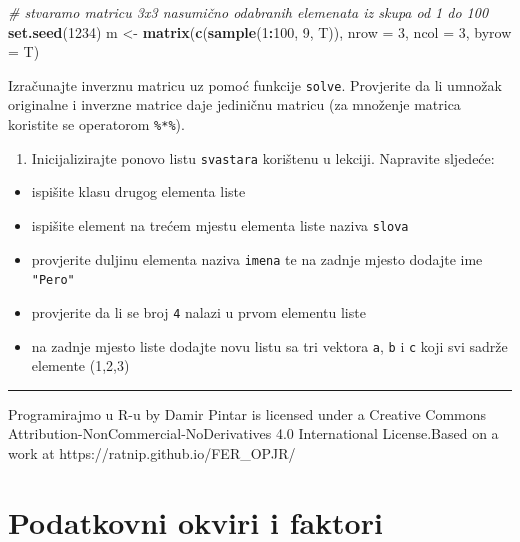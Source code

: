 \documentclass[]{book}
\newenvironment{Shaded}{\begin{snugshade}}{\end{snugshade}}
\newcommand{\KeywordTok}[1]{\textcolor[rgb]{0.13,0.29,0.53}{\textbf{#1}}}
\newcommand{\DataTypeTok}[1]{\textcolor[rgb]{0.13,0.29,0.53}{#1}}
\newcommand{\DecValTok}[1]{\textcolor[rgb]{0.00,0.00,0.81}{#1}}
\newcommand{\StringTok}[1]{\textcolor[rgb]{0.31,0.60,0.02}{#1}}
\newcommand{\CommentTok}[1]{\textcolor[rgb]{0.56,0.35,0.01}{\textit{#1}}}
\newcommand{\OperatorTok}[1]{\textcolor[rgb]{0.81,0.36,0.00}{\textbf{#1}}}
\newcommand{\NormalTok}[1]{#1}
\providecommand{\tightlist}{%
  \setlength{\itemsep}{0pt}\setlength{\parskip}{0pt}}
\theoremstyle{definition}
\theoremstyle{definition}
\theoremstyle{definition}
\theoremstyle{remark}
\begin{document}
\begin{Shaded}
\begin{Highlighting}[]
\CommentTok{# stvaramo matricu 3x3 nasumično odabranih elemenata iz skupa od 1 do 100}
\KeywordTok{set.seed}\NormalTok{(}\DecValTok{1234}\NormalTok{)}
\NormalTok{m <-}\StringTok{ }\KeywordTok{matrix}\NormalTok{(}\KeywordTok{c}\NormalTok{(}\KeywordTok{sample}\NormalTok{(}\DecValTok{1}\OperatorTok{:}\DecValTok{100}\NormalTok{, }\DecValTok{9}\NormalTok{, T)), }\DataTypeTok{nrow =} \DecValTok{3}\NormalTok{, }\DataTypeTok{ncol =} \DecValTok{3}\NormalTok{, }\DataTypeTok{byrow =}\NormalTok{ T)}
\end{Highlighting}
\end{Shaded}

Izračunajte inverznu matricu uz pomoć funkcije \texttt{solve}.
Provjerite da li umnožak originalne i inverzne matrice daje jediničnu
matricu (za množenje matrica koristite se operatorom \texttt{\%*\%}).

\begin{enumerate}
\def\labelenumi{\arabic{enumi}.}
\setcounter{enumi}{3}
\tightlist
\item
  Inicijalizirajte ponovo listu \texttt{svastara} korištenu u lekciji.
  Napravite sljedeće:
\end{enumerate}

\begin{itemize}
\tightlist
\item
  ispišite klasu drugog elementa liste
\item
  ispišite element na trećem mjestu elementa liste naziva \texttt{slova}
\item
  provjerite duljinu elementa naziva \texttt{imena} te na zadnje mjesto
  dodajte ime \texttt{"Pero"}
\item
  provjerite da li se broj \texttt{4} nalazi u prvom elementu liste
\item
  na zadnje mjesto liste dodajte novu listu sa tri vektora \texttt{a},
  \texttt{b} i \texttt{c} koji svi sadrže elemente (1,2,3)
\end{itemize}

\begin{center}\rule{0.5\linewidth}{\linethickness}\end{center}

{Programirajmo u R-u} by Damir Pintar is licensed under a Creative
Commons Attribution-NonCommercial-NoDerivatives 4.0 International
License.Based on a work at https://ratnip.github.io/FER\_OPJR/

\chapter{Podatkovni okviri i faktori}\label{okviri}
\end{document}
